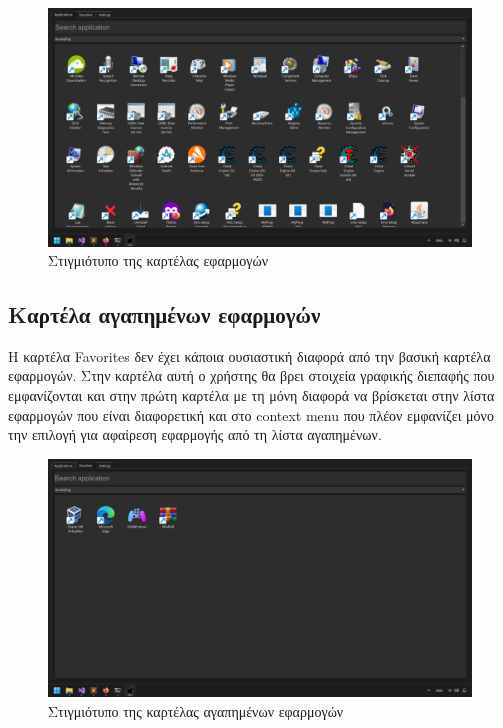 \begin{figure}[H]
    \centering
    \includegraphics[width=1.0\textwidth]{./images/tab_applications.png}
    \caption{Στιγμιότυπο της καρτέλας εφαρμογών}
\end{figure}


\subsection{Καρτέλα αγαπημένων εφαρμογών}

Η καρτέλα Favorites δεν έχει κάποια ουσιαστική διαφορά από την βασική καρτέλα εφαρμογών. Στην 
καρτέλα αυτή ο χρήστης θα βρει στοιχεία γραφικής διεπαφής που εμφανίζονται και στην πρώτη καρτέλα
με τη μόνη διαφορά να βρίσκεται στην λίστα εφαρμογών που είναι διαφορετική και στο context menu
που πλέον εμφανίζει μόνο την επιλογή για αφαίρεση εφαρμογής από τη λίστα αγαπημένων.

\begin{figure}[H]
    \centering
    \includegraphics[width=1.0\textwidth]{./images/tab_favorites.png}
    \caption{Στιγμιότυπο της καρτέλας αγαπημένων εφαρμογών}
\end{figure}


